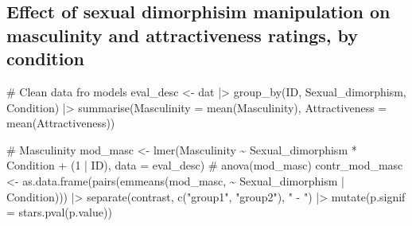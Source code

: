 \documentclass[
  bookmarksnumbered]{article}
\newenvironment{Shaded}{\begin{snugshade}}{\end{snugshade}}
\newcommand{\AttributeTok}[1]{\textcolor[rgb]{0.80,0.80,0.80}{#1}}
\newcommand{\CommentTok}[1]{\textcolor[rgb]{0.50,0.62,0.50}{#1}}
\newcommand{\DecValTok}[1]{\textcolor[rgb]{0.86,0.86,0.80}{#1}}
\newcommand{\FunctionTok}[1]{\textcolor[rgb]{0.94,0.94,0.56}{#1}}
\newcommand{\NormalTok}[1]{\textcolor[rgb]{0.80,0.80,0.80}{#1}}
\newcommand{\OtherTok}[1]{\textcolor[rgb]{0.94,0.94,0.56}{#1}}
\newcommand{\SpecialCharTok}[1]{\textcolor[rgb]{0.86,0.64,0.64}{#1}}
\newcommand{\StringTok}[1]{\textcolor[rgb]{0.80,0.58,0.58}{#1}}
\begin{document}
\subsection{Effect of sexual dimorphisim manipulation on masculinity and attractiveness ratings, by condition}\label{effect-of-sexual-dimorphisim-manipulation-on-masculinity-and-attractiveness-ratings-by-condition}

\begin{Shaded}
\begin{Highlighting}[]
\CommentTok{\# Clean data fro models}
\NormalTok{eval\_desc }\OtherTok{\textless{}{-}}\NormalTok{ dat }\SpecialCharTok{|\textgreater{}}
  \FunctionTok{group\_by}\NormalTok{(ID, Sexual\_dimorphism, Condition) }\SpecialCharTok{|\textgreater{}} 
  \FunctionTok{summarise}\NormalTok{(}\AttributeTok{Masculinity =} \FunctionTok{mean}\NormalTok{(Masculinity),}
            \AttributeTok{Attractiveness =} \FunctionTok{mean}\NormalTok{(Attractiveness))}

\CommentTok{\# Masculinity}
\NormalTok{mod\_masc }\OtherTok{\textless{}{-}} \FunctionTok{lmer}\NormalTok{(Masculinity }\SpecialCharTok{\textasciitilde{}}\NormalTok{ Sexual\_dimorphism }\SpecialCharTok{*}\NormalTok{ Condition }\SpecialCharTok{+}\NormalTok{ (}\DecValTok{1} \SpecialCharTok{|}\NormalTok{ ID), }\AttributeTok{data =}\NormalTok{ eval\_desc)}
\CommentTok{\# anova(mod\_masc)}
\NormalTok{contr\_mod\_masc }\OtherTok{\textless{}{-}} \FunctionTok{as.data.frame}\NormalTok{(}\FunctionTok{pairs}\NormalTok{(}\FunctionTok{emmeans}\NormalTok{(mod\_masc,}
                                              \SpecialCharTok{\textasciitilde{}}\NormalTok{ Sexual\_dimorphism }\SpecialCharTok{|}\NormalTok{ Condition))) }\SpecialCharTok{|\textgreater{}} 
  \FunctionTok{separate}\NormalTok{(contrast, }\FunctionTok{c}\NormalTok{(}\StringTok{"group1"}\NormalTok{, }\StringTok{"group2"}\NormalTok{), }\StringTok{" {-} "}\NormalTok{) }\SpecialCharTok{|\textgreater{}} 
  \FunctionTok{mutate}\NormalTok{(}\AttributeTok{p.signif =} \FunctionTok{stars.pval}\NormalTok{(p.value))}


\end{Highlighting}
\end{Shaded}
\end{document}
